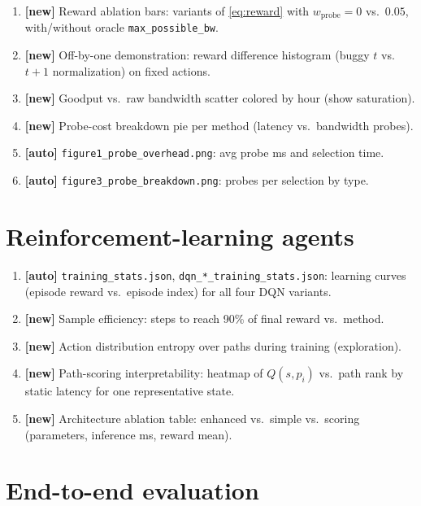 \documentclass[11pt,a4paper,twoside,openright]{report}
\begin{document}
\begin{enumerate}[resume]
  \item \textbf{[new]} Reward ablation bars: variants of \eqref{eq:reward} with
    $w_{\mathrm{probe}}{=}0$ vs.\ $0.05$, with/without oracle \texttt{max\_possible\_bw}.
  \item \textbf{[new]} Off-by-one demonstration: reward difference histogram
    (buggy $t$ vs.\ $t{+}1$ normalization) on fixed actions.
  \item \textbf{[new]} Goodput vs.\ raw bandwidth scatter colored by hour (show saturation).
  \item \textbf{[new]} Probe-cost breakdown pie per method (latency vs.\ bandwidth probes).
  \item \textbf{[auto]} \texttt{figure1\_probe\_overhead.png}: avg probe ms and selection time.
  \item \textbf{[auto]} \texttt{figure3\_probe\_breakdown.png}: probes per selection by type.
\end{enumerate}

\section{Reinforcement-learning agents}

\begin{enumerate}[resume]
  \item \textbf{[auto]} \texttt{training\_stats.json}, \texttt{dqn\_*\_training\_stats.json}:
    learning curves (episode reward vs.\ episode index) for all four DQN variants.
  \item \textbf{[new]} Sample efficiency: steps to reach 90\% of final reward vs.\ method.
  \item \textbf{[new]} Action distribution entropy over paths during training (exploration).
  \item \textbf{[new]} Path-scoring interpretability: heatmap of $Q(s,p_i)$ vs.\ path rank
    by static latency for one representative state.
  \item \textbf{[new]} Architecture ablation table: enhanced vs.\ simple vs.\ scoring
    (parameters, inference ms, reward mean).
\end{enumerate}

\section{End-to-end evaluation}
\end{document}
